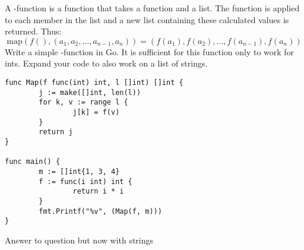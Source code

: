 \begin{Exercise}[title={Map function},difficulty=1]
\label{ex:map function}
A -function is a function that takes
a function and a list. The function is applied to 
each member in the list and a new list containing
these calculated values is returned.
Thus: 
$$ \mathrm{map}(f(), (a_1,a_2,\ldots,a_{n-1},a_n)) =  (f(a_1), f(a_2),\ldots,f(a_{n-1}), f(a_n)) $$
\Question \label{ex:map function q1} Write a simple
-function in Go. It is sufficient
for this function only to work for ints.
\Question \label{ex:map function q2} Expand your code to also work on a list of strings.

\end{Exercise}

\begin{Answer}

\Question 
\begin{lstlisting}[caption=A Map function]
func Map(f func(int) int, l []int) []int {
        j := make([]int, len(l))
        for k, v := range l {
                j[k] = f(v)
        }
        return j
}

func main() {
        m := []int{1, 3, 4}
        f := func(i int) int {
                return i * i
        }
        fmt.Printf("%v", (Map(f, m)))
}
\end{lstlisting}

\Question Answer to question but now with strings
\end{Answer}


